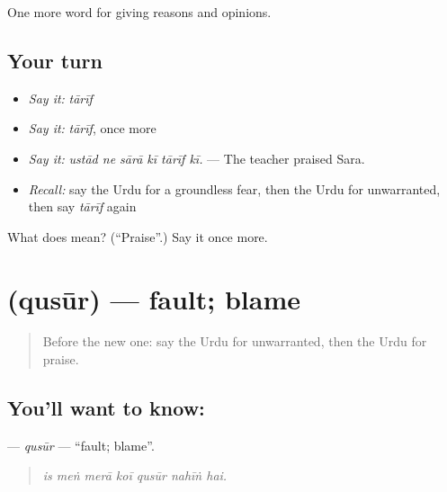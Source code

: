 \begin{grammarlens}[title={What you've built}]
One more word for giving reasons and opinions.
\end{grammarlens}

\subsection*{Your turn}
\begin{itemize}
\raggedright
  \item \emph{Say it:} \emph{tārīf}
  \item \emph{Say it:} \emph{tārīf}, once more
  \item \emph{Say it:} \emph{ustād ne sārā kī tārīf kī.} — The teacher praised Sara.
  \item \emph{Recall:} say the Urdu for a groundless fear, then the Urdu for unwarranted, then say \emph{tārīf} again
\end{itemize}

\begin{tcolorbox}[breakable,colback=teal!4,colframe=teal!35!black,title={Before you move on}]
What does  mean? (\textquotedblleft{}Praise\textquotedblright{}.) Say it once more.
\end{tcolorbox}
\section[\texorpdfstring{\ur{قصور} (qusūr)}{قصور (qusūr)}]{ (qusūr) — fault; blame}

\label{lesson:UR-C355-qusur}



\begin{quote}
Before the new one: say the Urdu for unwarranted, then the Urdu for praise.
\end{quote}

\subsection*{You'll want to know: }
\textbf{} — \emph{qusūr} — \textquotedblleft{}fault; blame\textquotedblright{}.

\begin{quote}
      
\end{quote}

\begin{quote}
\emph{is meṅ merā koī qusūr nahīṅ hai.}
\end{quote}

